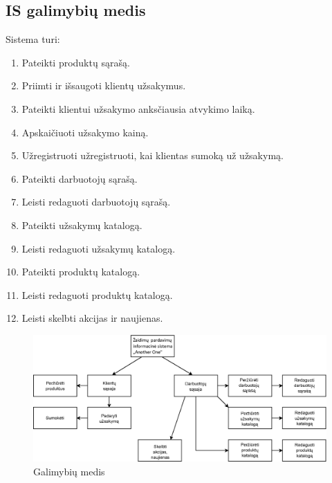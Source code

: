 \documentclass{VUMIFPSkursinis}
\begin{document}
\subsection{IS galimybių medis}
Sistema turi:
\begin{enumerate}
	\item Pateikti produktų sąrašą.
	\item Priimti ir išsaugoti klientų užsakymus.
	\item Pateikti klientui užsakymo anksčiausia atvykimo laiką.
	\item Apskaičiuoti užsakymo kainą.
	\item Užregistruoti užregistruoti, kai klientas sumoką už užsakymą.
	\item Pateikti darbuotojų sąrašą.
	\item Leisti redaguoti darbuotojų sąrašą.
	\item Pateikti užsakymų katalogą.
	\item Leisti redaguoti užsakymų katalogą.
	\item Pateikti produktų katalogą.
	\item Leisti redaguoti produktų katalogą.
	\item Leisti skelbti akcijas ir naujienas.
\end{enumerate}
\begin{figure}[H]
    \centering
    \includegraphics[scale=0.8]{img/GalimybiuMedis}
    \caption{Galimybių medis}
    \label{img:mlp}
\end{figure}

\newpage
\end{document}
